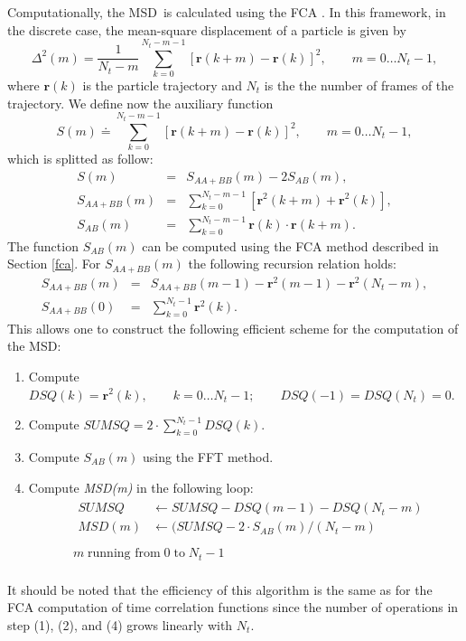 \documentclass[a4paper,11pt]{article}
\begin{document}
Computationally, the \gls{MSD}\ is calculated using the \gls{FCA} \cite{Kneller:KFA}. In this 
framework, in the discrete case, the mean-square displacement of a particle is given by
\begin{equation}
\label{eq:msd_discrete}
\Delta^2(m) = \frac{1}{N_t - m}\sum_{k=0}^{N_t-m-1}
[\textbf{r}(k+m) - \textbf{r}(k)]^2, \qquad m = 0\ldots N_t-1,
\end{equation}
where $\textbf{r}(k)$ is the particle trajectory and $N_t$ is the the number of frames of the trajectory. We define now the
auxiliary function
\begin{equation}
S(m) \doteq \sum_{k=0}^{N_t-m-1}[\textbf{r}(k+m) - \textbf{r}(k)]^2, 
\qquad m = 0\ldots N_t-1,
\end{equation}
which is splitted as follow:
\begin{eqnarray}
S(m)          &= &S_{AA+BB}(m) - 2 S_{AB}(m),\\
S_{AA+BB}(m)  &= &\sum_{k=0}^{N_t-m-1}[\textbf{r}^2(k+m) + \textbf{r}^2(k)], \\
S_{AB}(m)     &= &\sum_{k=0}^{N_t-m-1} \textbf{r}(k)\cdot\textbf{r}(k+m). 
\end{eqnarray}
The function $S_{AB}(m)$ can be computed using the \gls{FCA} method described
in Section \ref{fca}. For $S_{AA+BB}(m)$ the following recursion
relation holds:
\begin{eqnarray}
S_{AA+BB}(m) &= &S_{AA+BB}(m-1) - \textbf{r}^2(m-1)  - \textbf{r}^2(N_t - m),\\
S_{AA+BB}(0) &= &\sum_{k=0}^{N_t-1} \textbf{r}^2(k).
\end{eqnarray}
This allows one to construct the following efficient scheme for the
computation of the \gls{MSD}:
\begin{enumerate}
\item Compute $DSQ(k) = \textbf{r}^2(k),\qquad k = 0\ldots N_t-1;\qquad
      DSQ(-1) = DSQ(N_t) = 0$.
\item Compute $SUMSQ = 2\cdot\sum_{k=0}^{N_t-1} DSQ(k)$.
\item Compute $S_{AB}(m)$ using the \gls{FFT} method.
\item Compute \textit{MSD(m)} in the following loop:
      \begin{displaymath}
      \begin{array}{ll}
                &\begin{array}{ll}
                 SUMSQ  &\leftarrow SUMSQ - DSQ(m-1) - DSQ(N_t - m)\\
                 MSD(m) &\leftarrow (SUMSQ - 2\cdot S_{AB}(m)/(N_t-m)\\
                \end{array}\\
                 &m\; \mbox{running from}\; 0 \;\mbox{to}\; N_t - 1\\
      \end{array}
      \end{displaymath}
\end{enumerate}
It should be noted that the efficiency of this algorithm is the same
as for the \gls{FCA} computation of time correlation functions since the
number of operations in step (1), (2), and (4) grows linearly with
$N_t$.
\end{document}
